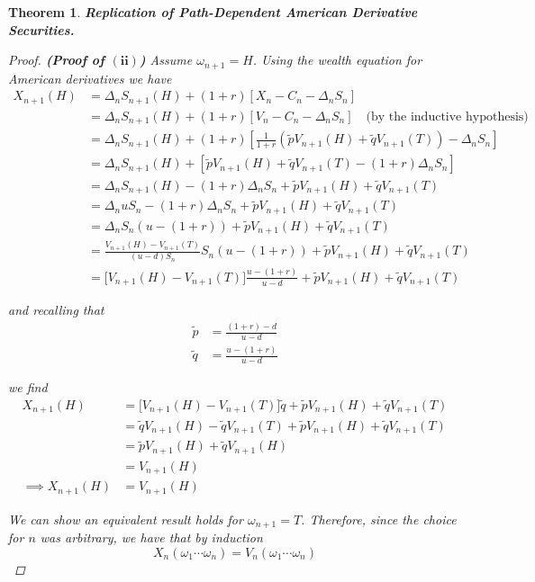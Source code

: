 \documentclass[12pt]{article}
\newtheorem{theorem}{Theorem}
\begin{document}
\begin{theorem} {\bf Replication of Path-Dependent American Derivative Securities.}
\begin{proof} {\bf {\em (Proof of $\bm{(ii)}$)}}
Assume $\omega_{n + 1} = H$. Using the wealth equation for American derivatives we have
\begin{align*}
	X_{n + 1}(H) &= \Delta_nS_{n + 1}(H) + (1 + r)[X_n - C_n - \Delta_nS_n] \\
	&= \Delta_nS_{n + 1}(H) + (1 + r)[V_n - C_n - \Delta_nS_n] \quad \text{(by the inductive hypothesis)} \\
	&= \Delta_nS_{n + 1}(H) + (1 + r)\left[ \frac{1}{1 + r}\left( \tilde{p}V_{n + 1}(H) + \tilde{q}V_{n + 1}(T) \right) - \Delta_nS_n \right] \\
	&= \Delta_nS_{n + 1}(H) + \left[ \tilde{p}V_{n + 1}(H) + \tilde{q}V_{n + 1}(T) - (1 + r)\Delta_nS_n \right] \\
	&= \Delta_nS_{n + 1}(H) - (1 + r)\Delta_nS_n + \tilde{p}V_{n + 1}(H) + \tilde{q}V_{n + 1}(T) \\
	&= \Delta_nuS_n - (1 + r)\Delta_nS_n + \tilde{p}V_{n + 1}(H) + \tilde{q}V_{n + 1}(T) \\
	&= \Delta_nS_n(u - (1 + r)) + \tilde{p}V_{n + 1}(H) + \tilde{q}V_{n + 1}(T) \\
	&= \frac{V_{n + 1}(H) - V_{n + 1}(T)}{(u - d)S_n}S_n(u - (1 + r)) + \tilde{p}V_{n + 1}(H) + \tilde{q}V_{n + 1}(T) \\
	&= \Big[V_{n + 1}(H) - V_{n + 1}(T)\Big] \frac{u - (1 + r)}{u - d} + \tilde{p}V_{n + 1}(H) + \tilde{q}V_{n + 1}(T)
\end{align*}

and recalling that
\begin{align*}
	\tilde{p} &= \frac{(1 + r) - d}{u - d} \\
	\tilde{q} &= \frac{u - (1 + r)}{u - d}
\end{align*}

we find
\begin{align*}
	X_{n + 1}(H) &= \Big[V_{n + 1}(H) - V_{n + 1}(T)\Big] \tilde{q} + \tilde{p}V_{n + 1}(H) + \tilde{q}V_{n + 1}(T) \\
	&= \tilde{q}V_{n + 1}(H) - \tilde{q}V_{n + 1}(T) + \tilde{p}V_{n + 1}(H) + \tilde{q}V_{n + 1}(T) \\
	&= \tilde{p}V_{n + 1}(H) + \tilde{q}V_{n + 1}(H) \\
	&= V_{n + 1}(H) \\
	\implies X_{n + 1}(H) &= V_{n + 1}(H)
\end{align*}

We can show an equivalent result holds for $\omega_{n + 1} = T$. Therefore, since the choice for $n$ was arbitrary, we have that by induction
\begin{equation*}
	X_n(\omega_1\cdots\omega_n) = V_n(\omega_1\cdots\omega_n)
\end{equation*}
\end{proof}


\end{theorem}
\end{document}
